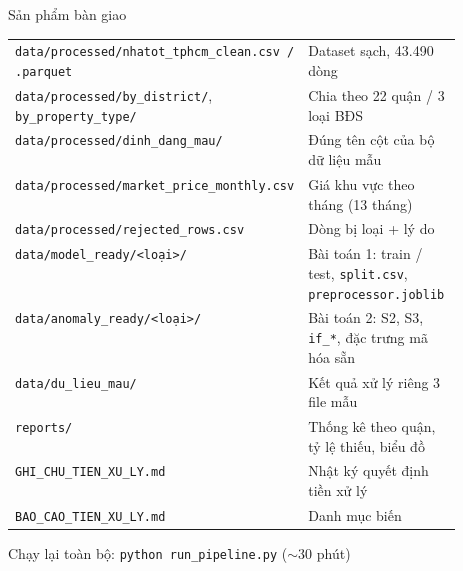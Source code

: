\documentclass[aspectratio=169,11pt]{beamer}
\newcommand{\ghichu}[1]{{\color{muted}\footnotesize #1}}
\begin{document}
\begin{frame}{Sản phẩm bàn giao}
  \footnotesize
  \renewcommand{\arraystretch}{1.15}
  \begin{tabularx}{\linewidth}{@{}>{\ttfamily}p{0.52\linewidth}X@{}}
    \toprule
    \texttt{data/processed/nhatot\_tphcm\_clean.csv / .parquet} & Dataset sạch, 43.490 dòng \\
    \texttt{data/processed/by\_district/}, \texttt{by\_property\_type/} & Chia theo 22 quận / 3 loại BĐS \\
    \texttt{data/processed/dinh\_dang\_mau/} & Đúng tên cột của bộ dữ liệu mẫu \\
    \texttt{data/processed/market\_price\_monthly.csv} & Giá khu vực theo tháng (13 tháng) \\
    \texttt{data/processed/rejected\_rows.csv} & Dòng bị loại + lý do \\
    \texttt{data/model\_ready/<loại>/} & Bài toán 1: train / test, \texttt{split.csv}, \texttt{preprocessor.joblib} \\
    \texttt{data/anomaly\_ready/<loại>/} & Bài toán 2: S2, S3, \texttt{if\_*}, đặc trưng mã hóa sẵn \\
    \texttt{data/du\_lieu\_mau/} & Kết quả xử lý riêng 3 file mẫu \\
    \texttt{reports/} & Thống kê theo quận, tỷ lệ thiếu, biểu đồ \\
    \texttt{GHI\_CHU\_TIEN\_XU\_LY.md} & Nhật ký quyết định tiền xử lý \\
    \texttt{BAO\_CAO\_TIEN\_XU\_LY.md} & Danh mục biến \\
    \bottomrule
  \end{tabularx}

  \vspace{1em}
  Chạy lại toàn bộ: \texttt{python run\_pipeline.py} \ghichu{($\sim$30 phút)}
\end{frame}
\end{document}

